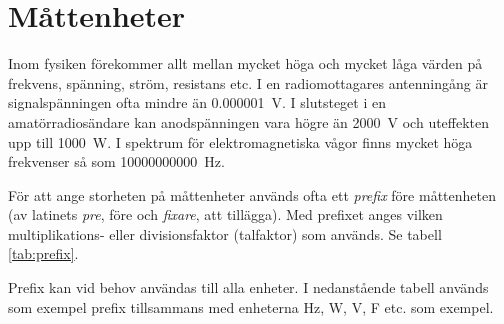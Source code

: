 \chapter{Måttenheter}

\noindent Inom fysiken förekommer allt mellan mycket höga och mycket
låga värden på frekvens, spänning, ström, resistans etc.  I en
radiomottagares antenningång är signalspänningen ofta mindre än
\SI{0,000001}{\volt}. I slutsteget i en amatörradiosändare kan
anodspänningen vara högre än \SI{2000}{\volt} och uteffekten upp till
\SI{1000}{\watt}. I spektrum för elektromagnetiska vågor finns mycket
höga frekvenser så som \SI{10000000000}{\hertz}.

För att ange storheten på måttenheter används ofta ett \emph{prefix}
före måttenheten (av latinets \emph{pre}, före och \emph{fixare}, att
tillägga). Med prefixet anges vilken multiplikations- eller
divisionsfaktor (talfaktor) som används. Se tabell \ref{tab:prefix}.

Prefix kan vid behov användas till alla enheter. I nedanstående tabell
används som exempel prefix tillsammans med enheterna \si{\hertz},
\si{\watt}, \si{\volt}, \si{\farad} etc. som exempel.


